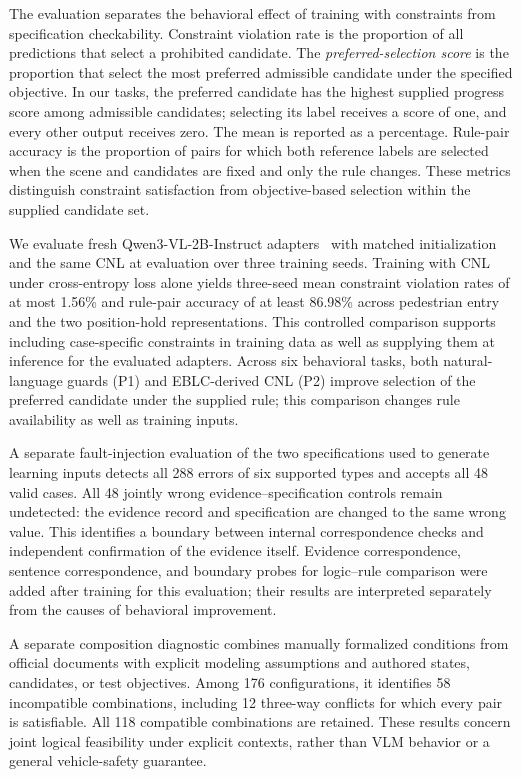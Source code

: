 The evaluation separates the behavioral effect of training with constraints
from specification checkability. Constraint violation rate is the proportion
of all predictions that select a prohibited candidate. The
\emph{preferred-selection score} is the proportion that select the most
preferred admissible candidate under the specified objective. In our tasks,
the preferred candidate has the highest supplied progress score among
admissible candidates; selecting its label receives a score of one, and every
other output receives zero. The mean is reported as a percentage. Rule-pair
accuracy is the proportion of pairs for which both reference labels are
selected when the scene and candidates are fixed and only the rule changes.
These metrics distinguish constraint satisfaction from objective-based
selection within the supplied candidate set.

We evaluate fresh Qwen3-VL-2B-Instruct adapters~\cite{qwen2025qwen3vl2b} with
matched initialization and the same CNL at evaluation over three training
seeds. Training with CNL under cross-entropy loss alone yields three-seed mean
constraint violation rates of at most 1.56\% and rule-pair accuracy of at least
86.98\% across pedestrian entry and the two position-hold representations.
This controlled comparison supports including case-specific constraints in
training data as well as supplying them at inference for the evaluated
adapters. Across six behavioral tasks, both natural-language guards (P1) and
EBLC-derived CNL (P2) improve selection of the preferred candidate under the
supplied rule; this comparison changes rule availability as well as training
inputs.

A separate fault-injection evaluation of the two specifications used to
generate learning inputs detects all 288 errors of six supported types and
accepts all 48 valid cases. All 48 jointly wrong evidence--specification
controls remain undetected: the evidence record and specification are changed
to the same wrong value. This identifies a boundary between internal
correspondence checks and independent confirmation of the evidence itself.
Evidence correspondence, sentence correspondence, and boundary probes for
logic--rule comparison were added after training for this evaluation; their
results are interpreted separately from the causes of behavioral improvement.

A separate composition diagnostic combines manually formalized conditions
from official documents with explicit modeling assumptions and authored
states, candidates, or test objectives. Among 176 configurations, it identifies
58 incompatible combinations, including 12 three-way conflicts for which
every pair is satisfiable. All 118 compatible combinations are retained. These results concern joint logical
feasibility under explicit contexts, rather than VLM behavior or a general
vehicle-safety guarantee.

